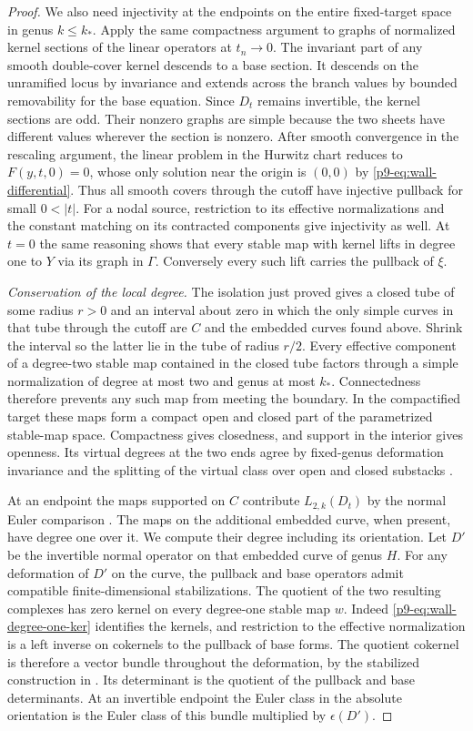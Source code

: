 \begin{proof}
We also need injectivity at the endpoints on the entire fixed-target
space in genus $k\le k_*$. Apply the same compactness argument to
graphs of normalized kernel sections of the linear operators at
$t_n\to0$. The invariant part of any smooth double-cover kernel
descends to a base section. It descends on the unramified locus by
invariance and extends across the branch values by bounded
removability for the base equation. Since $D_t$ remains invertible,
the kernel sections are odd. Their nonzero graphs are simple because
the two sheets have different values wherever the section is nonzero.
After smooth convergence in the rescaling argument, the linear problem
in the Hurwitz chart reduces to $F(y,t,0)=0$, whose only solution
near the origin is $(0,0)$ by \eqref{p9-eq:wall-differential}.
Thus all smooth covers through the cutoff have injective pullback for
small $0<|t|$. For a nodal source, restriction to its effective
normalizations and the constant matching on its contracted components
give injectivity as well. At $t=0$ the same reasoning shows that every
stable map with kernel lifts in degree one to $Y$ via its graph in
$\Gamma$. Conversely every such lift carries the pullback of $\xi$.

\smallskip
\noindent\emph{Conservation of the local degree.}
The isolation just proved gives a closed tube of some radius $r>0$
and an interval about zero in which the only simple curves in that
tube through the cutoff are $C$ and the embedded curves found above.
Shrink the interval so the latter lie in the tube of radius $r/2$.
Every effective component of a degree-two stable map contained in the
closed tube factors through a simple normalization of degree at most
two and genus at most $k_*$. Connectedness therefore prevents any
such map from meeting the boundary. In the compactified target these
maps form a compact open and closed part of the parametrized stable-map
space. Compactness gives closedness, and support in the interior gives
openness. Its virtual degrees at the two ends agree by fixed-genus deformation invariance and the splitting of the virtual
class over open and closed substacks \cite[\S3.1, (3.4)--(3.5)]{diw}.

At an endpoint the maps supported on $C$ contribute $L_{2,k}(D_t)$
by the normal Euler comparison \cite[Theorem~1.2, (1.7)]{zinger}.
The maps on the additional embedded curve, when present, have degree
one over it. We compute their degree including its orientation.
Let $D'$ be the invertible normal operator on that embedded curve
of genus $H$. For any deformation of $D'$ on the curve, the pullback and base operators
admit compatible finite-dimensional stabilizations. The quotient of the
two resulting complexes has zero kernel on every degree-one stable
map $w$. Indeed
\eqref{p9-eq:wall-degree-one-ker} identifies the kernels, and restriction
to the effective normalization is a left inverse on cokernels to the
pullback of base forms. The quotient cokernel is therefore a vector
bundle throughout the deformation, by the stabilized construction in
\cite[Appendix~B, (B.8)--(B.10)]{bai}. Its determinant is the
quotient of the pullback and base determinants. At an invertible
endpoint the Euler class in the absolute orientation is the Euler
class of this bundle multiplied by $\epsilon(D')$.


\end{proof}
